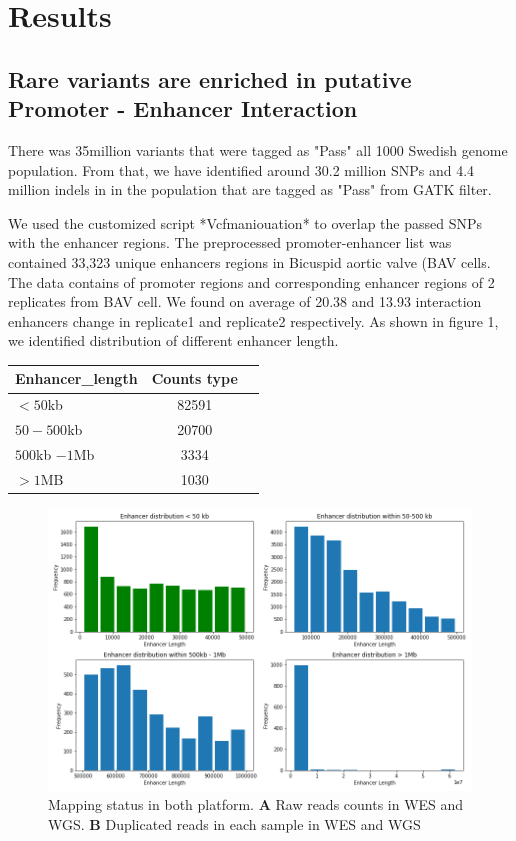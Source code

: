 \documentclass[11pt]{article} %
\begin{document}
\section{Results}

\subsection{Rare variants are enriched in putative Promoter - Enhancer Interaction}
There was 35million variants that were tagged as "Pass" all 1000 Swedish genome population. From that, we have identified around 30.2 million SNPs and 4.4 million indels in in the population that are tagged as "Pass" from GATK filter.

We used the customized script *Vcfmaniouation* to overlap the passed SNPs with the enhancer regions. The preprocessed promoter-enhancer list was contained 33,323 unique enhancers regions in Bicuspid aortic valve (BAV cells. The data contains of promoter regions and corresponding enhancer regions of 2 replicates from BAV cell. We found on average of 20.38 and 13.93 interaction enhancers change in replicate1 and replicate2 respectively. As shown in figure 1, we identified  distribution of different enhancer length. 
  
\begin{longtable}[]{@{}lcr@{}}
\toprule
 Enhancer\_length & Counts
type\tabularnewline
\midrule
\endhead
$< 50$kb   & 82591\tabularnewline
$50-500$kb   & 20700\tabularnewline
$500$kb $-1$Mb &  3334\tabularnewline
 $> 1$MB & 1030\tabularnewline
\bottomrule
\end{longtable}

\begin{figure}[H]
\begin{center}
\includegraphics[width=\textwidth]{length_distribution}

\caption{Mapping status in both platform. {\bf A} Raw reads counts in WES and WGS. {\bf B}  Duplicated reads in each sample in WES and WGS}
 \label{duplcated}
\end{center}
\end{figure}
\end{document}
